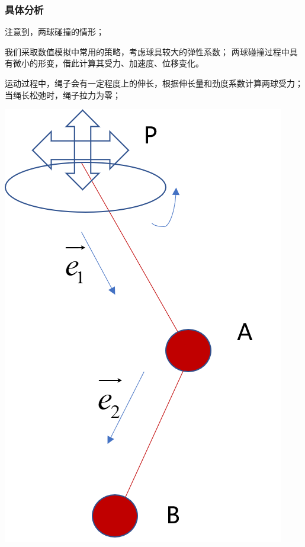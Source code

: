 \documentclass[12pt,a4paper]{ctexart}
\begin{document}
	\subsubsection{具体分析}
	\begin{minipage}[b]{0.65\linewidth}
		注意到，两球碰撞的情形；
		
		我们采取数值模拟中常用的策略，考虑球具较大的弹性系数；
		两球碰撞过程中具有微小的形变，借此计算其受力、加速度、位移变化。
		
		运动过程中，绳子会有一定程度上的伸长，根据伸长量和劲度系数计算两球受力；当绳长松弛时，绳子拉力为零；
		
	\end{minipage}
	\hfill
	\begin{minipage}[b]{0.35\linewidth}
		\includegraphics[height=8\baselineskip]{T51.PNG}
	\end{minipage}
	\clearpage
	\thispagestyle{empty}
\end{document}
